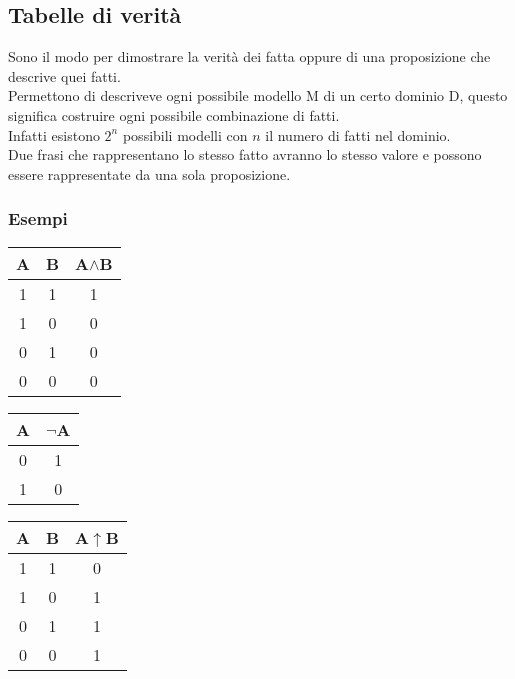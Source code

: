 \documentclass[../main.tex]{subfiles}
\begin{document}
    \subsection{Tabelle di verità}
    Sono il modo per dimostrare la verità dei fatta oppure di una proposizione che descrive quei fatti.\\
    Permettono di descriveve ogni possibile modello M di un certo dominio D, questo significa costruire ogni possibile combinazione di fatti.\\
    Infatti esistono $2^n$ possibili modelli con $n$ il numero di fatti nel dominio.\\
    Due frasi che rappresentano lo stesso fatto avranno lo stesso valore e possono essere rappresentate da una sola proposizione.
    \subsubsection{Esempi}
    \begin{minipage}{0.33333\textwidth}
        \begin{tabular}{|c|c|c|}
            \hline
            A & B & A$\land$B\\
            \hline
            1 & 1 & 1\\
            \hline
            1 & 0 & 0\\
            \hline
            0 & 1 & 0\\
            \hline
            0 & 0 & 0\\
            \hline
        \end{tabular}
    \end{minipage}
    \begin{minipage}{0.33333\textwidth}
        \begin{tabular}{|c|c|}
            \hline
            A & $\lnot$A\\
            \hline
            0 & 1\\
            \hline
            1 & 0\\
            \hline
        \end{tabular}
    \end{minipage}
    \begin{minipage}{0.33333\textwidth}
        \begin{tabular}{|c|c|c|}
            \hline
            A & B & A$\uparrow$B\\
            \hline
            1 & 1 & 0\\
            \hline
            1 & 0 & 1\\
            \hline
            0 & 1 & 1\\
            \hline
            0 & 0 & 1\\
            \hline
        \end{tabular}
    \end{minipage}
\end{document}
